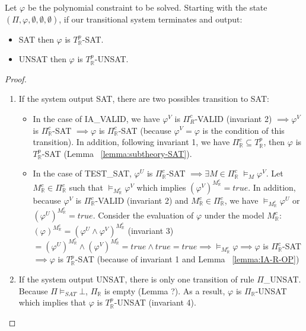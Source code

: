 \begin{theorem}
Let $\varphi$ be the polynomial constraint to be solved. Starting with the state $(\Pi, \varphi, \emptyset, \emptyset, \emptyset)$, if our transitional system terminates and output:
\begin{itemize}
\item SAT then $\varphi$ is $T^p_\mathbb{R}$-SAT.
\item UNSAT then $\varphi$ is $T^p_\mathbb{R}$-UNSAT.
\end{itemize}
\end{theorem}

\begin{proof}
\begin{enumerate}
\item If the system output SAT, there are two possibles transition to SAT:
\begin{itemize}
\item In the case of IA\_VALID, we have $\varphi^V$ is $\Pi^c_{R}$-VALID (invariant 2) $\implies \varphi^V$ is $\Pi^c_\mathbb{R}$-SAT $\implies \varphi$ is $\Pi^c_\mathbb{R}$-SAT (because $\varphi^V = \varphi$ is the condition of this transition). In addition, following invariant 1, we have $\Pi^c_\mathbb{R} \subseteq T^p_\mathbb{R}$, then $\varphi$ is $T^p_\mathbb{R}$-SAT (Lemma ~\ref{lemma:subtheory-SAT}).
\item In the case of TEST\_SAT, $\varphi^U$ is $\Pi^c_\mathbb{R}$-SAT $\implies \exists M \in \Pi^c_\mathbb{R} \; \models_M \varphi^V$. Let $M^c_\mathbb{R} \in \Pi^c_\mathbb{R}$ such that $\models_{M^c_\mathbb{R}} \varphi^V$ which implies $(\varphi^V)^{M^c_\mathbb{R}} = true$. In addition, because $\varphi^V$ is $\Pi^c_\mathbb{R}$-VALID (invariant 2) and $M^c_\mathbb{R} \in \Pi^c_\mathbb{R}$, we have $\models_{M^c_\mathbb{R}} \varphi^U$ or $(\varphi^U)^{M^c_\mathbb{R}} = true$. Consider the evaluation of $\varphi$ under the model $M^c_\mathbb{R}$: $(\varphi)^{M^c_\mathbb{R}} = (\varphi^U \wedge \varphi^V)^{M^c_\mathbb{R}}$ (invariant 3) $= (\varphi^U)^{M^c_\mathbb{R}} \wedge (\varphi^V)^{M^c_\mathbb{R}} = true \wedge true = true \implies \models_{M^c_\mathbb{R}} \varphi \implies \varphi$ is $\Pi^c_\mathbb{R}$-SAT $\implies \varphi$ is $T^p_\mathbb{R}$-SAT (because of invariant 1 and Lemma ~\ref{lemma:IA-R-OP})
\end{itemize}
\item  If the system output UNSAT, there is only one transition of rule $\Pi$\_UNSAT. Because $\Pi \models_{SAT} \bot$, $\Pi_\mathbb{R}$ is empty (Lemma ?). As a result, $\varphi$ is $\Pi_\mathbb{R}$-UNSAT which implies that $\varphi$ is $T^p_\mathbb{R}$-UNSAT (invariant 4).
\end{enumerate}
\end{proof}

